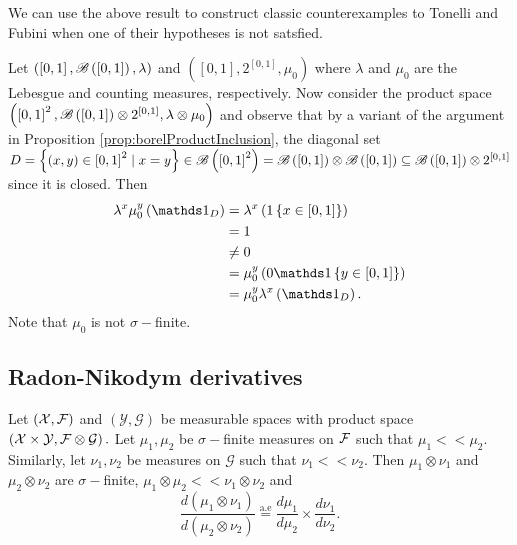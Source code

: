 We can use the above result to construct classic counterexamples to
Tonelli and Fubini when one of their hypotheses is not satsfied.
\begin{example}
\label{exa:tonelliFailNonSigmaFinite}Let $\left(\left[0,1\right],\mathscr{B}\left(\left[0,1\right]\right),\lambda\right)$
and $\left(\left[0,1\right],2^{\left[0,1\right]},\mu_{0}\right)$
where $\lambda$ and $\mu_{0}$ are the Lebesgue and counting measures,
respectively. Now consider the product space $\left(\left[0,1\right]^{2},\mathscr{B}\left(\left[0,1\right]\right)\otimes2^{\left[0,1\right]},\lambda\otimes\mu_{0}\right)$
and observe that by a variant of the argument in Proposition \ref{prop:borelProductInclusion},
the diagonal set $D=\left\{ \left(x,y\right)\in\left[0,1\right]^{2}\mid x=y\right\} \in\mathscr{B}\left(\left[0,1\right]^{2}\right)=\mathscr{B}\left(\left[0,1\right]\right)\otimes\mathscr{B}\left(\left[0,1\right]\right)\subseteq\mathscr{B}\left(\left[0,1\right]\right)\otimes2^{\left[0,1\right]}$
since it is closed. Then
\begin{align*}
\lambda^{x}\mu_{0}^{y}\left(\indicate_{D}\right) & =\lambda^{x}\left(1\left\{ x\in\left[0,1\right]\right\} \right)\\
 & =1\\
 & \neq0\\
 & =\mu_{0}^{y}\left(0\indicate\left\{ y\in\left[0,1\right]\right\} \right)\\
 & =\mu_{0}^{y}\lambda^{x}\left(\indicate_{D}\right).
\end{align*}
Note that $\mu_{0}$ is not $\sigma-$finite.
\end{example}


\subsection{Radon-Nikodym derivatives}
\begin{prop}
\label{prop:prodRadonNikodymDerivatives}Let $\left(\mathcal{X},\mathcal{F}\right)$
and $\left(\mathcal{Y},\mathcal{G}\right)$ be measurable spaces with
product space $\left(\mathcal{X}\times\mathcal{Y},\mathcal{F}\otimes\mathcal{G}\right).$
Let $\mu_{1},\mu_{2}$ be $\sigma-$finite measures on $\mathcal{F}$ such
that $\mu_{1}<<\mu_{2}$. Similarly, let $\nu_{1},\nu_{2}$ be measures
on $\mathcal{G}$ such that $\nu_{1}<<\nu_{2}$. Then $\mu_{1}\otimes\nu_{1}$
and $\mu_{2}\otimes\nu_{2}$ are $\sigma-$finite, $\mu_{1}\otimes\mu_{2}<<\nu_{1}\otimes\nu_{2}$
and
\[
\frac{d\left(\mu_{1}\otimes\nu_{1}\right)}{d\left(\mu_{2}\otimes\nu_{2}\right)}\stackrel{\text{a.e}}{=}\frac{d\mu_{1}}{d\mu_{2}}\times\frac{d\nu_{1}}{d\nu_{2}}.
\]
\end{prop}

